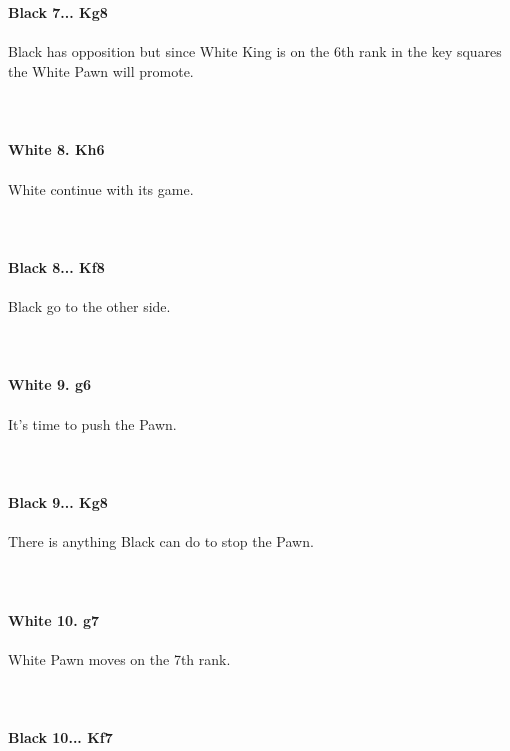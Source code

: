 \documentclass{article}
\begin{document}
\\
\\
\textbf{Black 7... Kg8}\\
\\
Black has opposition but since White King is on the 6th rank in the key squares the White Pawn will promote.\\
\\

\\
\\
\textbf{White 8. Kh6}\\
\\
White continue with its game.\\
\\

\\
\\
\textbf{Black 8... Kf8}\\
\\
Black go to the other side.\\
\\

\\
\\
\textbf{White 9. g6}\\
\\
It's time to push the Pawn.\\
\\

\\
\\
\textbf{Black 9... Kg8}\\
\\
There is anything Black can do to stop the Pawn.\\
\\

\\
\\
\textbf{White 10. g7}\\
\\
White Pawn moves on the 7th rank.\\
\\

\\
\\
\textbf{Black 10... Kf7}\\
\end{document}
